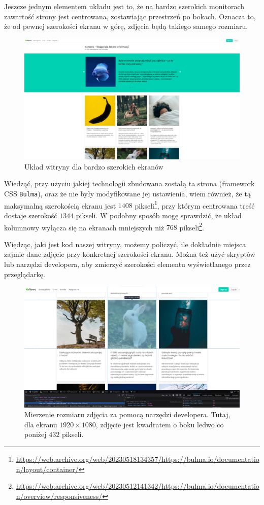 \documentclass[licencjacka]{pracadypl}
\begin{document}
Jeszcze jednym elementem układu jest to, że na bardzo szerokich monitorach zawartość strony jest centrowana, zostawiając przestrzeń po bokach. Oznacza to, że od pewnej szerokości ekranu w górę, zdjęcia będą takiego samego rozmiaru. 

\begin{figure}[H]
  \includegraphics[width=\linewidth]{images/screenshot-very-wide.png}
  \caption{Układ witryny dla bardzo szerokich ekranów}
  \label{fig:screenshot-verywide}
\end{figure}


Wiedząć, przy użyciu jakiej technologii zbudowana zostałą ta strona (framework CSS \texttt{Bulma}), oraz że nie były modyfikowane jej ustawienia, wiem również, że tą maksymalną szerokością ekranu jest $1408$ pikseli\footnote{\url{https://web.archive.org/web/20230518134357/https://bulma.io/documentation/layout/container/}}, przy którym centrowana treść dostaje szerokość $1344$ pikseli. W podobny sposób mogę sprawdzić, że układ kolumnowy wyłącza się na ekranach mniejszych niż $768$ pikseli\footnote{\url{https://web.archive.org/web/20230512141342/https://bulma.io/documentation/overview/responsiveness/}}.

Więdząc, jaki jest kod naszej witryny, możemy policzyć, ile dokładnie miejsca zajmie dane zdjęcie przy konkretnej szerokości ekranu. Można też użyć skryptów lub narzędzi developera, aby zmierzyć szerokości elementu wyświetlanego przez przeglądarkę.

\begin{figure}[H]
  \includegraphics[width=\linewidth]{images/screenshot-devtools-1080width.png}
  \caption{Mierzenie rozmiaru zdjęcia za pomocą narzędzi developera. Tutaj, dla ekranu $1920\times1080$, zdjęcie jest kwadratem o boku ledwo co poniżej $432$ pikseli.}
  \label{fig:screenshot-measuring}
\end{figure}
\end{document}
